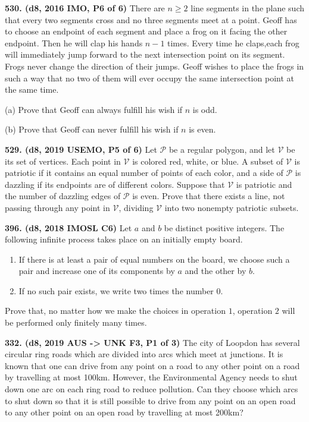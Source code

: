 \documentclass{article}
\begin{document}
\textbf{530. (\color{red}d8\color{black}, 2016 IMO, P6 of 6)} There are $n\ge 2$ line segments in the plane such that every two segments cross and no three segments meet at a point. Geoff has to choose an endpoint of each segment and place a frog on it facing the other endpoint. Then he will clap his hands $n-1$ times. Every time he claps,each frog will immediately jump forward to the next intersection point on its segment. Frogs never change the direction of their jumps. Geoff wishes to place the frogs in such a way that no two of them will ever occupy the same intersection point at the same time.

(a) Prove that Geoff can always fulfill his wish if $n$ is odd.

(b) Prove that Geoff can never fulfill his wish if $n$ is even.

\textbf{529. (\color{red}d8\color{black}, 2019 USEMO, P5 of 6)} Let $\mathcal{P}$ be a regular polygon, and let $\mathcal{V}$ be its set of vertices. Each point in $\mathcal{V}$ is colored red, white, or blue. A subset of $\mathcal{V}$ is patriotic if it contains an equal number of points of each color, and a side of $\mathcal{P}$ is dazzling if its endpoints are of different colors.
\bigbreak
Suppose that $\mathcal{V}$ is patriotic and the number of dazzling edges of $\mathcal{P}$ is even. Prove that there exists a line, not passing through any point in $\mathcal{V}$, dividing $\mathcal{V}$ into two nonempty patriotic subsets.

\textbf{396. (\color{red}d8\color{black}, 2018 IMOSL C6)} Let $a$ and $b$ be distinct positive integers. The following infinite process takes place on an initially empty board.

\begin{enumerate}
        \item If there is at least a pair of equal numbers on the board, we choose such a pair and increase one of its components by $a$ and the other by $b$.
        \item If no such pair exists, we write two times the number $0$.
\end{enumerate}
Prove that, no matter how we make the choices in operation $1$, operation $2$ will be performed only finitely many times.

\textbf{332. (\color{red}d8\color{black}, 2019 AUS -> UNK F3, P1 of 3)} The city of Loopdon has several circular ring roads which are divided into arcs which meet at junctions. It is known that one can drive from any point on a road to any other point on a road by travelling at most 100km. However, the Environmental Agency needs to shut down one arc on each ring road to reduce pollution. Can they choose which arcs to shut down so that it is still possible to drive from any point on an open road to any other point on an open road by travelling at most 200km?
\end{document}
